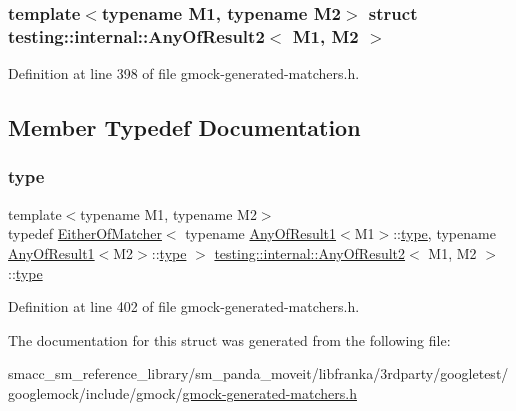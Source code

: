 \subsubsection*{template$<$typename M1, typename M2$>$\newline
struct testing\+::internal\+::\+Any\+Of\+Result2$<$ M1, M2 $>$}



Definition at line 398 of file gmock-\/generated-\/matchers.\+h.



\subsection{Member Typedef Documentation}
\mbox{\label{structtesting_1_1internal_1_1AnyOfResult2_a6d9eba508021f8e652c7c154a649073f}} 
\subsubsection{\texorpdfstring{type}{type}}
{\footnotesize\ttfamily template$<$typename M1, typename M2$>$ \\
typedef \hyperlink{classtesting_1_1internal_1_1EitherOfMatcher}{Either\+Of\+Matcher}$<$ typename \hyperlink{structtesting_1_1internal_1_1AnyOfResult1}{Any\+Of\+Result1}$<$M1$>$\+::\hyperlink{structtesting_1_1internal_1_1AnyOfResult2_a6d9eba508021f8e652c7c154a649073f}{type}, typename \hyperlink{structtesting_1_1internal_1_1AnyOfResult1}{Any\+Of\+Result1}$<$M2$>$\+::\hyperlink{structtesting_1_1internal_1_1AnyOfResult2_a6d9eba508021f8e652c7c154a649073f}{type} $>$ \hyperlink{structtesting_1_1internal_1_1AnyOfResult2}{testing\+::internal\+::\+Any\+Of\+Result2}$<$ M1, M2 $>$\+::\hyperlink{structtesting_1_1internal_1_1AnyOfResult2_a6d9eba508021f8e652c7c154a649073f}{type}}



Definition at line 402 of file gmock-\/generated-\/matchers.\+h.



The documentation for this struct was generated from the following file\+:\begin{DoxyCompactItemize}
\item 
smacc\+\_\+sm\+\_\+reference\+\_\+library/sm\+\_\+panda\+\_\+moveit/libfranka/3rdparty/googletest/googlemock/include/gmock/\hyperlink{gmock-generated-matchers_8h}{gmock-\/generated-\/matchers.\+h}\end{DoxyCompactItemize}

